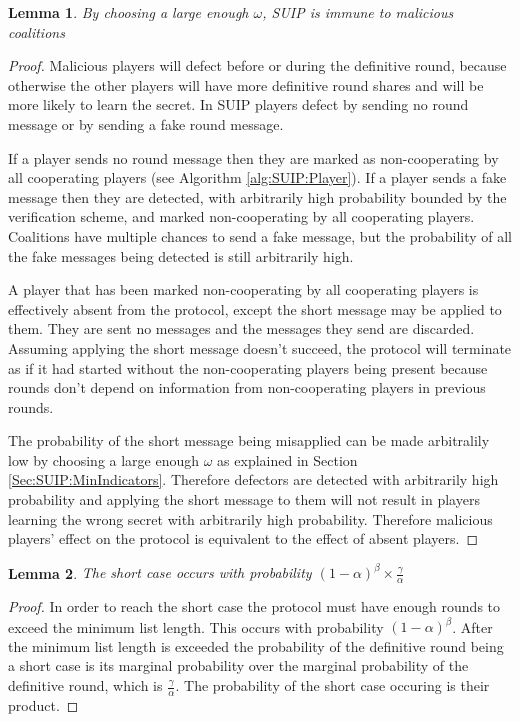 \documentclass{dalcsthesis}
\newtheorem{lemma}{Lemma}
\begin{document}
\begin{lemma} By choosing a large enough $\omega$, SUIP is immune to malicious coalitions \label{Lem:SUIP:MaliciousImmune} \end{lemma}
\begin{proof}
Malicious players will defect before or during the definitive round, because otherwise the other players will have more definitive round shares and will be more likely to learn the secret. In SUIP players defect by sending no round message or by sending a fake round message.

If a player sends no round message then they are marked as non-cooperating by all cooperating players (see Algorithm \ref{alg:SUIP:Player}). If a player sends a fake message then they are detected, with arbitrarily high probability bounded by the verification scheme, and marked non-cooperating by all cooperating players. Coalitions have multiple chances to send a fake message, but the probability of all the fake messages being detected is still arbitrarily high.

A player that has been marked non-cooperating by all cooperating players is effectively absent from the protocol, except the short message may be applied to them. They are sent no messages and the messages they send are discarded. Assuming applying the short message doesn't succeed, the protocol will terminate as if it had started without the non-cooperating players being present because rounds don't depend on information from non-cooperating players in previous rounds.

The probability of the short message being misapplied can be made arbitralily low by choosing a large enough $\omega$ as explained in Section \ref{Sec:SUIP:MinIndicators}. Therefore defectors are detected with arbitrarily high probability and applying the short message to them will not result in players learning the wrong secret with arbitrarily high probability. Therefore malicious players' effect on the protocol is equivalent to the effect of absent players.
\end{proof}

\begin{lemma} The short case occurs with probability $(1-\alpha)^\beta \times \frac{\gamma}{\alpha}$ \label{Lem:SUIP:ChanceOfShortCase} \end{lemma}
\begin{proof}
In order to reach the short case the protocol must have enough rounds to exceed the minimum list length. This occurs with probability $(1-\alpha)^\beta$. After the minimum list length is exceeded the probability of the definitive round being a short case is its marginal probability over the marginal probability of the definitive round, which is $\frac{\gamma}{\alpha}$. The probability of the short case occuring is their product.
\end{proof}
\end{document}
